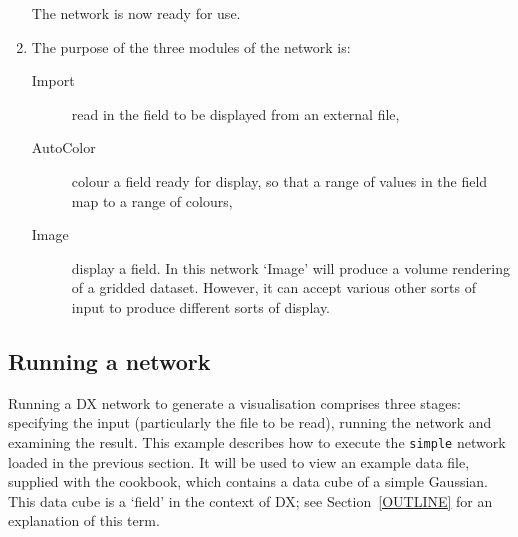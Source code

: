 \documentclass[twoside,11pt]{starlink}
\begin{document}
\begin{enumerate}
   The network is now ready for use.

  \item The purpose of the three modules of the network is:

  \begin{description}

    \item[Import] read in the field to be displayed from an external
     file,

    \item[AutoColor] colour a field ready for display, so that a range
     of values in the field map to a range of colours,

    \item[Image] display a field. In this network `Image' will produce a
     volume rendering of a gridded dataset. However, it can accept
     various other sorts of input to produce different sorts of display.

  \end{description}

\end{enumerate}

\subsection{\label{RUNNET}Running a network}


Running a DX network to generate a visualisation comprises three stages:
specifying the input (particularly the file to be read), running the
network and examining the result. This example describes how to execute
the \texttt{simple} network loaded in the previous section. It will be used
to view an example data file, supplied with the cookbook, which contains
a data cube of a simple Gaussian. This data cube is a `field' in the
context of DX; see Section~\ref{OUTLINE} for an explanation of this
term.
\end{document}
